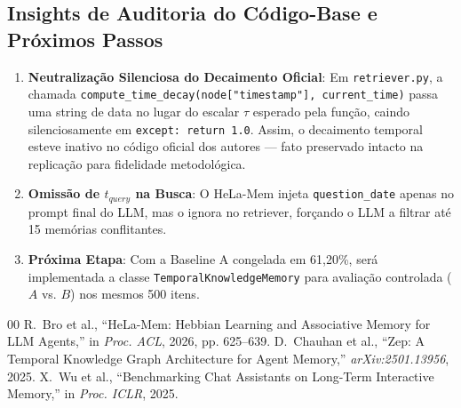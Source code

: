 \documentclass[10pt,conference,twocolumn]{IEEEtran}
\begin{document}
\subsection{Insights de Auditoria do Código-Base e Próximos Passos}
\begin{enumerate}
    \item \textbf{Neutralização Silenciosa do Decaimento Oficial}: Em \texttt{retriever.py}, a chamada \texttt{compute\_time\_decay(node["timestamp"], current\_time)} passa uma string de data no lugar do escalar $\tau$ esperado pela função, caindo silenciosamente em \texttt{except: return 1.0}. Assim, o decaimento temporal esteve inativo no código oficial dos autores — fato preservado intacto na replicação para fidelidade metodológica.
    \item \textbf{Omissão de $t_{query}$ na Busca}: O HeLa-Mem injeta \texttt{question\_date} apenas no prompt final do LLM, mas o ignora no retriever, forçando o LLM a filtrar até 15 memórias conflitantes.
    \item \textbf{Próxima Etapa}: Com a Baseline A congelada em 61,20\%, será implementada a classe \texttt{TemporalKnowledgeMemory} para avaliação controlada ($A$ vs. $B$) nos mesmos 500 itens.
\end{enumerate}

\begin{thebibliography}{00}
 R.~Bro et al., ``HeLa-Mem: Hebbian Learning and Associative Memory for LLM Agents,'' in \textit{Proc. ACL}, 2026, pp. 625--639.
 D.~Chauhan et al., ``Zep: A Temporal Knowledge Graph Architecture for Agent Memory,'' \textit{arXiv:2501.13956}, 2025.
 X.~Wu et al., ``Benchmarking Chat Assistants on Long-Term Interactive Memory,'' in \textit{Proc. ICLR}, 2025.
\end{thebibliography}
\end{document}
